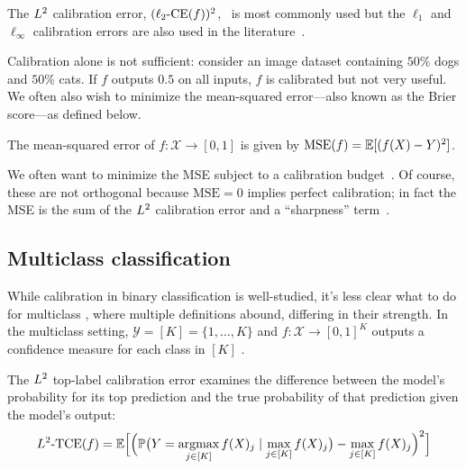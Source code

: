 The $L^2$ calibration error, $(\ell_2\textup{-CE}(f))^2$,~\cite{murphy1973vector,murphy1977reliability,degroot1983forecasters, nguyen2015posterior, hendrycks2019anomaly, kuleshov2015calibrated, hendrycks2019pretraining, brocker2012empirical} is most commonly used but the $\ell_1$ and $\ell_{\infty}$ calibration errors are also used in the literature~\cite{guo2017calibration, naeini2015obtaining, nixon2019calibration}.

Calibration alone is not sufficient: consider an image dataset containing $50\%$ dogs and $50\%$ cats.
If $f$ outputs $0.5$ on all inputs, $f$ is calibrated but not very useful.
We often also wish to minimize the mean-squared error---also known as the Brier score---as defined below.

\begin{definition}
The mean-squared error of $f : \mathcal{X} \to [0, 1]$ is given by $\textup{MSE}(f) = \mathbb{E}[(f(X) - Y)^2]$.
\end{definition}

We often want to minimize the MSE subject to a calibration budget~\cite{gneiting2005weather, gneiting2007probabilistic}. Of course, these  are not orthogonal  because $\mbox{MSE} = 0$ implies perfect calibration; in fact the MSE is the sum of the $L^2$ calibration error and a ``sharpness'' term~\cite{murphy1973vector,degroot1983forecasters, kuleshov2015calibrated}.

\subsection{Multiclass classification}

While calibration in binary classification is  well-studied,
it's less clear what to do for multiclass , where multiple definitions abound, differing in their strength. In the multiclass setting, $\mathcal{Y} = [K] = \{1, \dots, K\}$ and $f : \mathcal{X} \to [0, 1]^K$ outputs a confidence measure for each class in $[K]$ .

\begin{definition}
The $L^2$ top-label calibration error examines the difference between the model's probability for its top prediction and the true probability of that prediction given the model's output:
\begin{align}
L^2\textup{-TCE}(f) = \mathbb{E}\Big[ \Big( \mathbb{P}\big(Y = \mathop{\mbox{argmax}}_{j \in [K]} f(X)_j \mid \max_{j \in [K]} f(X)_j\big) - \max_{j \in [K]} f(X)_j \Big)^2 \Big]
\end{align}
\end{definition}


